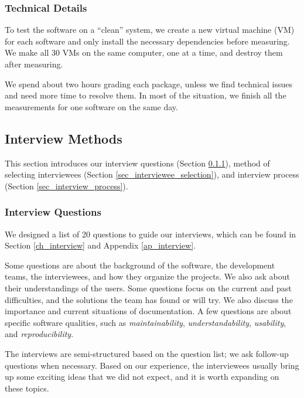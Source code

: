 \documentclass[preprint,12pt,authoryear]{elsarticle}
\begin{document}
\subsubsection{Technical Details} \label{sec_technical_details}

To test the software on a ``clean'' system, we create a new virtual machine (VM)
for each software and only install the necessary dependencies before measuring.
We make all 30 VMs on the same computer, one at a time, and destroy them after
measuring.

We spend about two hours grading each package, unless we find technical issues
and need more time to resolve them. In most of the situation, we finish all the
measurements for one software on the same day.

\subsection{Interview Methods} \label{sec_interview_methods}

This section introduces our interview questions (Section
\ref{sec_interview_questions}), method of selecting interviewees (Section
\ref{sec_interviewee_selection}), and interview process (Section
\ref{sec_interview_process}).

\subsubsection{Interview Questions} \label{sec_interview_questions}

We designed a list of 20 questions to guide our interviews, which can be found
in Section \ref{ch_interview} and Appendix \ref{ap_interview}.

Some questions are about the background of the software, the development teams,
the interviewees, and how they organize the projects. We also ask about their
understandings of the users. Some questions focus on the current and past
difficulties, and the solutions the team has found or will try. We also discuss
the importance and current situations of documentation. A few questions are
about specific software qualities, such as \textit{maintainability},
\textit{understandability}, \textit{usability}, and \textit{reproducibility}.

The interviews are semi-structured based on the question list; we ask follow-up
questions when necessary. Based on our experience, the interviewees usually
bring up some exciting ideas that we did not expect, and it is worth expanding
on these topics.
\end{document}
